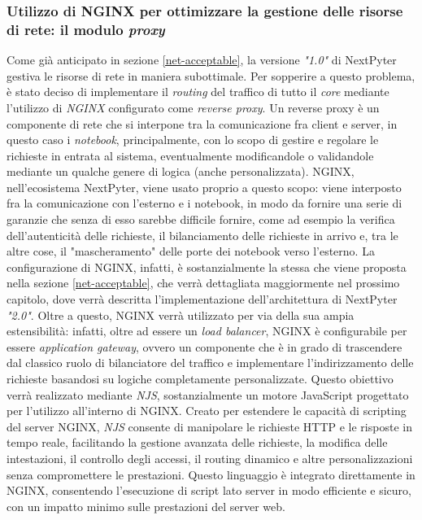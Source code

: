 \subsubsection{Utilizzo di NGINX per ottimizzare la gestione delle risorse di rete: il modulo \textit{proxy}}
Come già anticipato in sezione \ref{net-acceptable}, la versione \textit{"1.0"} di NextPyter gestiva le risorse di rete in maniera subottimale. Per sopperire a questo problema, è stato deciso di implementare il \textit{routing} del traffico di tutto il \textit{core} mediante l'utilizzo di \textit{NGINX} configurato come \textit{reverse proxy}.
\newline
Un reverse proxy è un componente di rete che si interpone tra la comunicazione fra client e server, in questo caso i \textit{notebook}, principalmente, con lo scopo di gestire e regolare le richieste in entrata al sistema, eventualmente modificandole o validandole mediante un qualche genere di logica (anche personalizzata).
\newline
NGINX, nell'ecosistema NextPyter, viene usato proprio a questo scopo: viene interposto fra la comunicazione con l'esterno e i notebook, in modo da fornire una serie di garanzie che senza di esso sarebbe difficile fornire, come ad esempio la verifica dell'autenticità delle richieste, il bilanciamento delle richieste in arrivo e, tra le altre cose, il "mascheramento" delle porte dei notebook verso l'esterno. La configurazione di NGINX, infatti, è sostanzialmente la stessa che viene proposta nella sezione \ref{net-acceptable}, che verrà dettagliata maggiormente nel prossimo capitolo, dove verrà descritta l'implementazione dell'architettura di NextPyter \textit{"2.0"}.
\newline
Oltre a questo, NGINX verrà utilizzato per via della sua ampia estensibilità: infatti, oltre ad essere un \textit{load balancer}, NGINX è configurabile per essere \textit{application gateway}, ovvero un componente che è in grado di trascendere dal classico ruolo di bilanciatore del traffico e implementare l'indirizzamento delle richieste basandosi su logiche completamente personalizzate.
\newline
Questo obiettivo verrà realizzato mediante \textit{NJS}, sostanzialmente un motore JavaScript progettato per l'utilizzo all'interno di NGINX. Creato per estendere le capacità di scripting del server NGINX, \textit{NJS} consente di manipolare le richieste HTTP e le risposte in tempo reale, facilitando la gestione avanzata delle richieste, la modifica delle intestazioni, il controllo degli accessi, il routing dinamico e altre personalizzazioni senza compromettere le prestazioni. Questo linguaggio è integrato direttamente in NGINX, consentendo l'esecuzione di script lato server in modo efficiente e sicuro, con un impatto minimo sulle prestazioni del server web.
